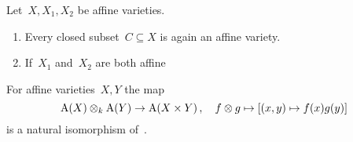 \begin{lemma}
  Let~$X, X_1, X_2$ be affine varieties.
  \begin{enumerate}
    \item
      Every closed subset~$C \subseteq X$ is again an affine variety.
    \item
      If~$X_1$ and~$X_2$ are both affine 
  \end{enumerate}
\end{lemma}


\begin{lemma}
  \label{coordinate ring of product of qaffine}
  For affine varieties~$X,Y$ the map
  \[
            \operatorname{A}(X) \otimes_k \operatorname{A}(Y)
    \to     \operatorname{A}(X \times Y) \,,
    \quad   f \otimes g
    \mapsto [(x, y) \mapsto f(x) g(y)]
  \]
  is a  natural isomorphism of~.
\end{lemma}


